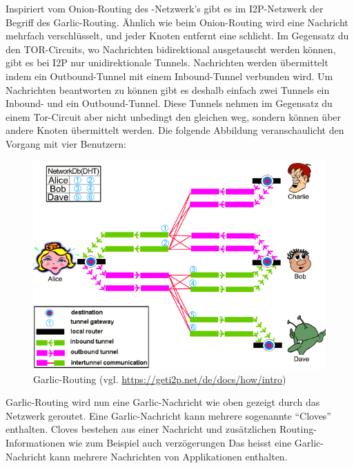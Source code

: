 Inspiriert vom Onion-Routing des -Netzwerk's gibt es im I2P-Netzwerk der Begriff des Garlic-Routing.
Ähnlich wie beim Onion-Routing wird eine Nachricht mehrfach verschlüsselt, und jeder Knoten entfernt eine schlicht.
Im Gegensatz du den TOR-Circuits, wo Nachrichten bidirektional ausgetauscht werden können, gibt es bei I2P nur unidirektionale Tunnels.
Nachrichten werden übermittelt indem ein Outbound-Tunnel mit einem Inbound-Tunnel verbunden wird.
Um Nachrichten beantworten zu können gibt es deshalb einfach zwei Tunnels ein Inbound- und ein Outbound-Tunnel.
Diese Tunnels nehmen im Gegensatz du einem Tor-Circuit aber nicht unbedingt den gleichen weg, sondern können über andere Knoten übermittelt werden.
Die folgende Abbildung  veranschaulicht den Vorgang mit vier Benutzern:

\begin{figure}[H]
    \includegraphics[width=\textwidth]{img/i2prouting.png}
    \caption{Garlic-Routing (vgl. \url{https://geti2p.net/de/docs/how/intro})}\label{fig:garlic_routing}
\end{figure}

Garlic-Routing wird nun eine Garlic-Nachricht wie oben gezeigt durch das Netzwerk geroutet.
Eine Garlic-Nachricht kann mehrere sogenannte ``Cloves'' enthalten.
Cloves bestehen aus einer Nachricht und zusätzlichen Routing-Informationen wie zum Beispiel auch verzögerungen
Das heisst eine Garlic-Nachricht kann mehrere Nachrichten von Applikationen enthalten.

\parencite[S. 4]{conrad_survey_2014,noauthor_intro_nodate}


